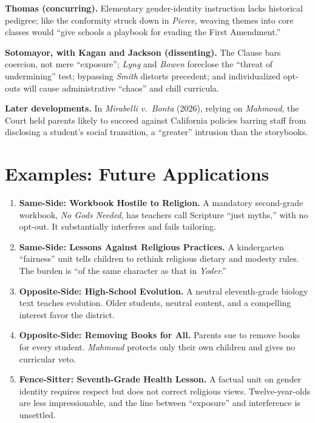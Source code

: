 \documentclass[12pt]{article}
\begin{document}
\textbf{Thomas (concurring).} Elementary gender-identity instruction lacks historical pedigree; like the conformity struck down in \textit{Pierce}, weaving themes into core classes would ``give schools a playbook for evading the First Amendment.''

\textbf{Sotomayor, with Kagan and Jackson (dissenting).} The Clause bars coercion, not mere ``exposure''; \textit{Lyng} and \textit{Bowen} foreclose the ``threat of undermining'' test; bypassing \textit{Smith} distorts precedent; and individualized opt-outs will cause administrative ``chaos'' and chill curricula.

\textbf{Later developments.} In \textit{Mirabelli v.\ Bonta} (2026), relying on \textit{Mahmoud}, the Court held parents likely to succeed against California policies barring staff from disclosing a student's social transition, a ``greater'' intrusion than the storybooks.

\section{Examples: Future Applications}

\begin{enumerate}
\item \textbf{Same-Side: Workbook Hostile to Religion.} A mandatory second-grade workbook, \textit{No Gods Needed}, has teachers call Scripture ``just myths,'' with no opt-out. It substantially interferes and fails tailoring.
\item \textbf{Same-Side: Lessons Against Religious Practices.} A kindergarten ``fairness'' unit tells children to rethink religious dietary and modesty rules. The burden is ``of the same character as that in \textit{Yoder}.''
\item \textbf{Opposite-Side: High-School Evolution.} A neutral eleventh-grade biology text teaches evolution. Older students, neutral content, and a compelling interest favor the district.
\item \textbf{Opposite-Side: Removing Books for All.} Parents sue to remove books for every student. \textit{Mahmoud} protects only their own children and gives no curricular veto.
\item \textbf{Fence-Sitter: Seventh-Grade Health Lesson.} A factual unit on gender identity requires respect but does not correct religious views. Twelve-year-olds are less impressionable, and the line between ``exposure'' and interference is unsettled.
\end{enumerate}
\end{document}
